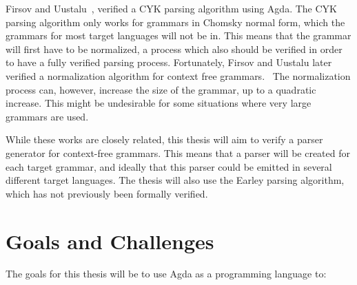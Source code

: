 \documentclass{article}
\begin{document}
	Firsov and Uustalu~\cite{Firsov14}, verified a CYK parsing algorithm using
	Agda. The CYK parsing algorithm only works for grammars in Chomsky normal
	form, which the grammars for most target languages will not be in. This
	means that the grammar will first have to be normalized, a process which
	also should be verified in order to have a fully verified parsing process.
	Fortunately, Firsov and Uustalu later verified a normalization algorithm
	for context free grammars.~\cite{Firsov15} The normalization process can,
	however, increase the size of the grammar, up to a quadratic increase. This
	might be undesirable for some situations where very large grammars are
	used.

	While these works are closely related, this thesis will aim to verify a
	parser generator for context-free grammars. This means that a parser will
	be created for each target grammar, and ideally that this parser could be
	emitted in several different target languages. The thesis will also use the
	Earley parsing algorithm, which has not previously been formally verified.

\section{Goals and Challenges}


	The goals for this thesis will be to use Agda as a programming language to:
\end{document}

